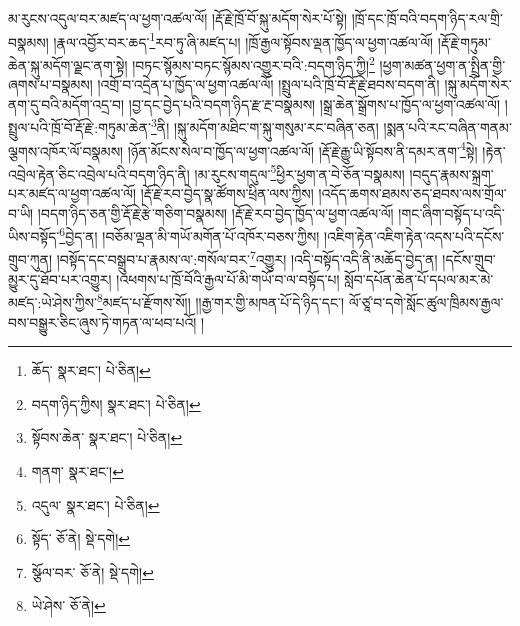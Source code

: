 མ་རུངས་འདུལ་བར་མཛད་ལ་ཕྱག་འཚལ་ལོ། །རྡོ་རྗེ་ཁྲོ་བོ་སྐུ་མདོག་སེར་པོ་སྟེ། །ཁྲོ་དང་ཁྲོ་བའི་བདག་ཉིད་རལ་གྲི་བསྣམས། །རྣལ་འབྱོར་བར་ཆད་\footnote{ཆོད་  སྣར་ཐང་།  པེ་ཅིན། }རབ་ཏུ་ཞི་མཛད་པ། །ཁྲོ་རྒྱལ་སྟོབས་ལྡན་ཁྱོད་ལ་ཕྱག་འཚལ་ལོ། །རྡོ་རྗེ་གཏུམ་ཆེན་སྐུ་མདོག་ལྗང་ནག་སྟེ། །བཏང་སྙོམས་བཏང་སྙོམས་འགྱུར་བའི་:བདག་ཉིད་ཀྱི།\footnote{བདག་ཉིད་ཀྱིས།  སྣར་ཐང་།  པེ་ཅིན། } །ཕྱག་མཚན་ཕྱག་ན་སྤྲིན་གྱི་ཞགས་པ་བསྣམས། །འགྲོ་བ་འདྲེན་པ་ཁྱོད་ལ་ཕྱག་འཚལ་ལོ། །སྤྲུལ་པའི་ཁྲོ་བོ་རྡོ་རྗེ་ཐབས་བདག་ནི། །སྐུ་མདོག་སེར་ནག་དུ་བའི་མདོག་འདྲ་བ། །བྱ་དང་བྱེད་པའི་བདག་ཉིད་རྫ་རྔ་བསྣམས། །སྒྲ་ཆེན་སྒྲོགས་པ་ཁྱོད་ལ་ཕྱག་འཚལ་ལོ། །སྤྲུལ་པའི་ཁྲོ་བོ་རྡོ་རྗེ་:གཏུམ་ཆེན་\footnote{སྟོབས་ཆེན་  སྣར་ཐང་།  པེ་ཅིན། }ནི། །སྐུ་མདོག་མཐིང་ག་སྐུ་གསུམ་རང་བཞིན་ཅན། །སྨན་པའི་རང་བཞིན་གནམ་ལྕགས་འཁོར་ལོ་བསྣམས། །ཉོན་མོངས་སེལ་བ་ཁྱོད་ལ་ཕྱག་འཚལ་ལོ། །རྡོ་རྗེ་རྒྱུ་ཡི་སྟོབས་ནི་དམར་ནག་\footnote{གནག་  སྣར་ཐང་། }སྟེ། །རྟེན་འབྲེལ་རྟེན་ཅིང་འབྲེལ་པའི་བདག་ཉིད་ནི། །མ་རུངས་གདུལ་\footnote{འདུལ་  སྣར་ཐང་།  པེ་ཅིན། }ཕྱིར་ཕྱག་ན་བེ་ཅོན་བསྣམས། །བདུད་རྣམས་སྐྲག་པར་མཛད་ལ་ཕྱག་འཚལ་ལོ། །རྡོ་རྗེ་རབ་བྱེད་སྣ་ཚོགས་ཕྲིན་ལས་ཀྱིས། །འདོད་ཆགས་ཐམས་ཅད་ཐབས་ལས་གྲོལ་བ་ཡི། །བདག་ཉིད་ཅན་གྱི་རྡོ་རྗེ་རྩེ་གཅིག་བསྣམས། །རྡོ་རྗེ་རབ་བྱེད་ཁྱོད་ལ་ཕྱག་འཚལ་ལོ། །གང་ཞིག་བསྟོད་པ་འདི་ཡིས་བསྟོད་\footnote{སྟོད་  ཅོ་ནེ།  སྡེ་དགེ། }བྱེད་ན། །བཅོམ་ལྡན་མི་གཡོ་མགོན་པོ་འཁོར་བཅས་ཀྱིས། །འཇིག་རྟེན་འཇིག་རྟེན་འདས་པའི་དངོས་གྲུབ་ཀུན། །བསྟོད་དང་བསྒྲུབ་པ་རྣམས་ལ་:གསོལ་བར་\footnote{སྩོལ་བར་  ཅོ་ནེ།  སྡེ་དགེ། }འགྱུར། །འདི་བསྟོད་འདི་ནི་མཆོད་བྱེད་ན། །དངོས་གྲུབ་མྱུར་དུ་ཐོབ་པར་འགྱུར། །འཕགས་པ་ཁྲོ་བོའི་རྒྱལ་པོ་མི་གཡོ་བ་ལ་བསྟོད་པ། སློབ་དཔོན་ཆེན་པོ་དཔལ་མར་མེ་མཛད་:ཡེ་ཤེས་ཀྱིས་\footnote{ཡེ་ཤེས་  ཅོ་ནེ། }མཛད་པ་རྫོགས་སོ།། །།རྒྱ་གར་གྱི་མཁན་པོ་དེ་ཉིད་དང་། ལོ་ཙཱ་བ་དགེ་སློང་ཚུལ་ཁྲིམས་རྒྱལ་བས་བསྒྱུར་ཅིང་ཞུས་ཏེ་གཏན་ལ་ཕབ་པའོ། ། 